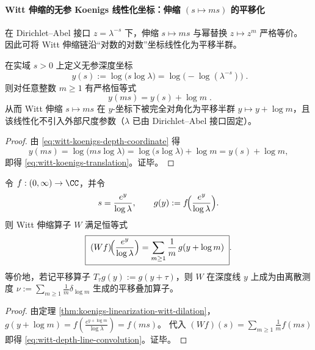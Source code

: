 \paragraph{Witt 伸缩的无参 Koenigs 线性化坐标：伸缩 \texorpdfstring{$(s\mapsto ms)$}{(s->ms)} 的平移化}
在 Dirichlet--Abel 接口 \(z=\lambda^{-s}\) 下，伸缩 \(s\mapsto ms\) 与幂替换 \(z\mapsto z^{m}\) 严格等价。
因此可将 Witt 伸缩链沿“对数的对数”坐标线性化为平移半群。

\begin{theorem}\label{thm:koenigs-linearization-witt-dilation}
在实域 \(s>0\) 上定义无参深度坐标
\begin{equation}\label{eq:witt-koenigs-depth-coordinate}
\boxed{\;
y(s):=\log\!\bigl(s\log\lambda\bigr)
=\log\!\bigl(-\log(\lambda^{-s})\bigr)\; }.
\end{equation}
则对任意整数 \(m\ge 1\) 有严格恒等式
\begin{equation}\label{eq:witt-koenigs-translation}
\boxed{\; y(ms)=y(s)+\log m\; }.
\end{equation}
从而 Witt 伸缩 \(s\mapsto ms\) 在 \(y\)-坐标下被完全对角化为平移半群 \(y\mapsto y+\log m\)，且该线性化不引入外部尺度参数（\(\lambda\) 已由 Dirichlet--Abel 接口固定）。
\end{theorem}
\begin{proof}
由 \eqref{eq:witt-koenigs-depth-coordinate} 得
\[
y(ms)=\log\!\bigl(ms\log\lambda\bigr)=\log\!\bigl(s\log\lambda\bigr)+\log m=y(s)+\log m,
\]
即得 \eqref{eq:witt-koenigs-translation}。证毕。
\end{proof}

\begin{corollary}\label{cor:witt-depth-line-convolution}
令 \(f:(0,\infty)\to\CC\)，并令
\[
s=\frac{e^{y}}{\log\lambda},
\qquad
g(y):=f\!\Bigl(\frac{e^{y}}{\log\lambda}\Bigr).
\]
则 Witt 伸缩算子 \(W\) 满足恒等式
\begin{equation}\label{eq:witt-depth-line-convolution}
\boxed{\;
(Wf)\!\Bigl(\frac{e^{y}}{\log\lambda}\Bigr)
=\sum_{m\ge 1}\frac{1}{m}\,g(y+\log m)\; }.
\end{equation}
等价地，若记平移算子 \(T_{\tau}g(y):=g(y+\tau)\)，则 \(W\) 在深度线 \(y\) 上成为由离散测度
\(
\nu:=\sum_{m\ge 1}\frac{1}{m}\delta_{\log m}
\)
生成的平移叠加算子。
\end{corollary}
\begin{proof}
由定理 \ref{thm:koenigs-linearization-witt-dilation}，
\(
g(y+\log m)=f(\tfrac{e^{y+\log m}}{\log\lambda})=f(ms)
\)。
代入 \( (Wf)(s)=\sum_{m\ge 1}\frac{1}{m}f(ms)\) 即得 \eqref{eq:witt-depth-line-convolution}。证毕。
\end{proof}

